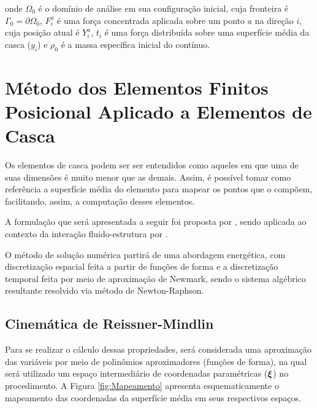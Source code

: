 \noindent onde $\Omega_0$ é o domínio de análise em sua configuração inicial, cuja fronteira é $\Gamma_0=\partial\Omega_0$, $F_i^a$ é uma força concentrada aplicada sobre um ponto $a$ na direção $i$, cuja posição atual é $Y_i^a$, $t_i$ é uma força distribuída sobre uma superfície média da casca ($y_i$) e $\rho_0$ é a massa específica inicial do contínuo.


\section{Método dos Elementos Finitos Posicional Aplicado a Elementos de Casca} \label{MEFP}

Os elementos de casca podem ser ser entendidos como aqueles em que uma de suas dimensões é muito menor que as demais. Assim, é possível tomar como referência a superfície média do elemento para mapear os pontos que o compõem, facilitando, assim, a computação desses elementos.

A formulação que será apresentada a seguir foi proposta por , sendo aplicada ao contexto da interação fluido-estrutura por .

O método de solução numérica partirá de uma abordagem energética, com discretização espacial feita a partir de funções de forma e a discretização temporal feita por meio de aproximação de Newmark, sendo o sistema algébrico resultante resolvido via método de Newton-Raphson.


\subsection{Cinemática de Reissner-Mindlin}

Para se realizar o cálculo dessas propriedades, será considerada uma aproximação das variáveis por meio de polinômios aproximadores (funções de forma), na qual será utilizado um espaço intermediário de coordenadas paramétricas ($\boldsymbol{\xi}$) no procedimento. A Figura \ref{fig:Mapeamento} apresenta esquematicamente o mapeamento das coordenadas da superfície média em seus respectivos espaços.

